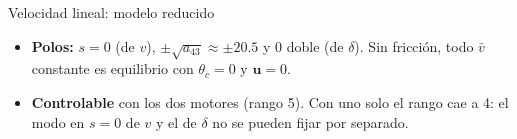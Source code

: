 \documentclass[10pt,aspectratio=169]{beamer}
\newcommand{\vx}{\mathbf{x}}
\newcommand{\vu}{\mathbf{u}}
\newcommand{\rf}{\text{ref}}
\begin{document}
\begin{frame}{Velocidad lineal: modelo reducido}
\begin{itemize}
  $\vu=-K\,(\vx_v-\vx_\rf)$, con
  $\vx_\rf=\begin{bmatrix}v_\rf&0&0&\delta_\rf&0\end{bmatrix}^{\!\top}$,
  $K\in\mathbb{R}^{2\times5}$, $Q\in\mathbb{R}^{5\times5}$, $R\in\mathbb{R}^{2\times2}$.
  \item \textbf{Polos:} $s=0$ (de $v$), $\pm\sqrt{a_{43}}\approx\pm20.5$ y $0$ doble
  (de $\delta$). Sin fricción, todo $\bar v$ constante es equilibrio con
  $\theta_c=0$ y $\vu=0$.
  \item \textbf{Controlable} con los dos motores (rango 5). Con uno solo el rango
  cae a 4: el modo en $s=0$ de $v$ y el de $\delta$ no se pueden fijar por
  separado.
\end{itemize}
\end{frame}

\end{document}
